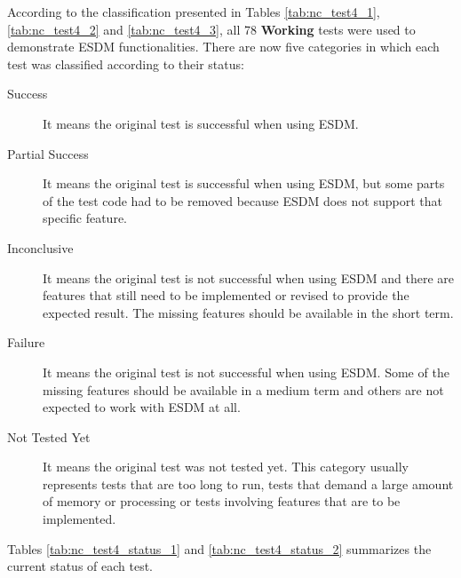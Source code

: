 According to the classification presented in Tables \ref{tab:nc_test4_1}, \ref{tab:nc_test4_2} and \ref{tab:nc_test4_3}, all 78 {\bf Working} tests were used to demonstrate ESDM functionalities. There are now five categories in which each test was classified according to their status:

\begin{description}

\item[Success] It means the original test is successful when using ESDM.

\item[Partial Success] It means the original test is successful when using ESDM, but some parts of the test code had to be removed because ESDM does not support that specific feature.

\item[Inconclusive] It means the original test is not successful when using ESDM and there are features that still need to be implemented or revised to provide the expected result. The missing features should be available in the short term.

\item[Failure] It means the original test is not successful when using ESDM. Some of the missing features should be available in a medium term and others are not expected to work with ESDM at all.

\item[Not Tested Yet] It means the original test was not tested yet. This category usually represents tests that are too long to run, tests that demand a large amount of memory or processing or tests involving features that are to be implemented.

\end{description}

Tables \ref{tab:nc_test4_status_1} and \ref{tab:nc_test4_status_2} summarizes the current status of each test.

